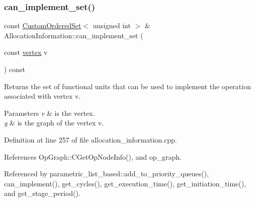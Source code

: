 \subsubsection{\texorpdfstring{can\+\_\+implement\+\_\+set()}{can\_implement\_set()}\hspace{0.1cm}{\footnotesize\ttfamily [1/2]}}
{\footnotesize\ttfamily const \hyperlink{classCustomOrderedSet}{Custom\+Ordered\+Set}$<$ unsigned int $>$ \& Allocation\+Information\+::can\+\_\+implement\+\_\+set (\begin{DoxyParamCaption}\item[{const \hyperlink{graph_8hpp_abefdcf0544e601805af44eca032cca14}{vertex}}]{v }\end{DoxyParamCaption}) const}



Returns the set of functional units that can be used to implement the operation associated with vertex v. 


\begin{DoxyParams}{Parameters}
{\em v} & is the vertex. \\
\hline
{\em g} & is the graph of the vertex v. \\
\hline
\end{DoxyParams}


Definition at line 257 of file allocation\+\_\+information.\+cpp.



References Op\+Graph\+::\+C\+Get\+Op\+Node\+Info(), and op\+\_\+graph.



Referenced by parametric\+\_\+list\+\_\+based\+::add\+\_\+to\+\_\+priority\+\_\+queues(), can\+\_\+implement(), get\+\_\+cycles(), get\+\_\+execution\+\_\+time(), get\+\_\+initiation\+\_\+time(), and get\+\_\+stage\+\_\+period().


